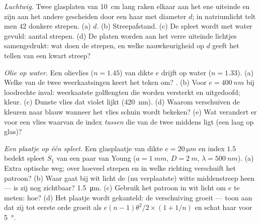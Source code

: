 \begin{exercise}[$\star\star$]\label{exo:b2:two-wave-interference:8}
\emph{Luchtwig.} Twee glasplaten van \qty{10}{cm} lang raken elkaar aan het
ene uiteinde en
zijn aan het andere gescheiden door een haar met diameter $d$; in natriumlicht
telt men $42$ donkere strepen. (a) $d$. (b) Streepafstand. (c) De spleet
wordt met water gevuld: aantal strepen. (d) De platen worden aan het verre uiteinde
lichtjes samengedrukt: wat doen de strepen, en welke nauwkeurigheid op
$d$ geeft het tellen van een kwart streep?
\end{exercise}

\begin{exercise}[$\star\star$]\label{exo:b2:two-wave-interference:9}
\emph{Olie op water.} Een olievlies ($n = 1.45$) van dikte $e$ drijft
op water ($n = 1.33$). (a) Welke van de twee weerkaatsingen keert het
teken om? . (b) Voor $e = \qty{400}{nm}$ bij loodrechte inval:
weerkaatste golflengten die worden versterkt en uitgedoofd; kleur. (c) Dunste
vlies dat violet lijkt (\qty{420}{nm}). (d) Waarom verschuiven de kleuren naar
blauw wanneer het vlies schuin wordt bekeken? (e) Wat verandert er voor een vlies
waarvan de index \emph{tussen} die van de twee middens ligt (een laag op
glas)?
\end{exercise}

\begin{exercise}[$\star\star\star$]\label{exo:b2:two-wave-interference:10}
\emph{Een plaatje op één spleet.} Een glasplaatje van dikte $e = \qty{20}{\micro m}$
en index $1.5$ bedekt spleet $S_1$ van een paar van Young
($a = \qty{1}{mm}$, $D =
\qty{2}{m}$, $\lambda = \qty{500}{nm}$). (a) Extra
optische weg; over hoeveel strepen
en in welke richting verschuift het patroon? (b) Waar gaat bij wit licht
de (nu verplaatste) witte middenstreep heen --- is zij nog
zichtbaar?  \qty{1.5}{\micro m}. (c) Gebruik het patroon in wit
licht om $e$ te meten: hoe? (d) Het plaatje wordt gekanteld: de verschuiving groeit
--- toon aan dat zij tot eerste orde groeit als
$e(n - 1)\theta^2/2 \times (1 + 1/n)$
en schat haar voor \qty{5}{\degree}.
\end{exercise}

